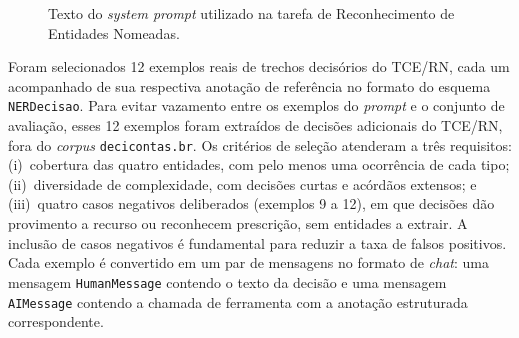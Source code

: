 \begin{figure}
\centering
{}
\caption{Texto do \textit{system prompt} utilizado na tarefa de Reconhecimento de Entidades Nomeadas.}
\label{quad:system_prompt}
\end{figure}

Foram selecionados 12 exemplos reais de trechos decisórios do TCE/RN, cada um acompanhado de sua respectiva anotação de referência no formato do esquema \texttt{NERDecisao}. Para evitar vazamento entre os exemplos do \textit{prompt} e o conjunto de avaliação, esses 12 exemplos foram extraídos de decisões adicionais do TCE/RN, fora do \textit{corpus} \texttt{decicontas.br}. Os critérios de seleção atenderam a três requisitos: (i)~cobertura das quatro entidades, com pelo menos uma ocorrência de cada tipo; (ii)~diversidade de complexidade, com decisões curtas e acórdãos extensos; e (iii)~quatro casos negativos deliberados (exemplos 9 a 12), em que decisões dão provimento a recurso ou reconhecem prescrição, sem entidades a extrair. A inclusão de casos negativos é fundamental para reduzir a taxa de falsos positivos. Cada exemplo é convertido em um par de mensagens no formato de \textit{chat}: uma mensagem \texttt{HumanMessage} contendo o texto da decisão e uma mensagem \texttt{AIMessage} contendo a chamada de ferramenta com a anotação estruturada correspondente.

